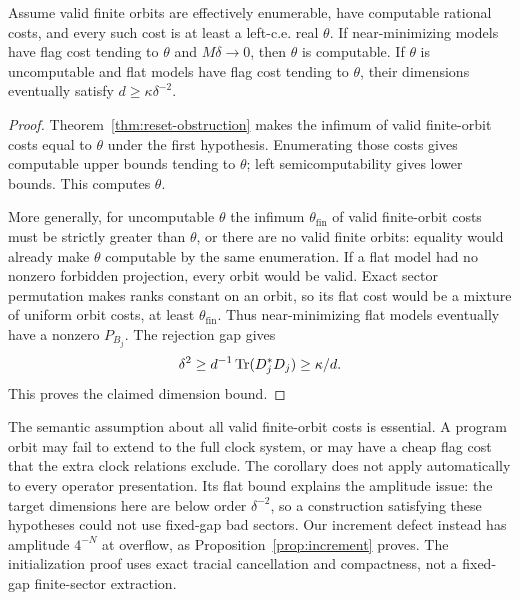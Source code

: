 \begin{corollary}\label{cor:reset-computability}
Assume valid finite orbits are effectively enumerable, have computable rational costs, and every such cost is at least a left-c.e. real $\theta$. If near-minimizing models have flag cost tending to $\theta$ and $M\delta\to0$, then $\theta$ is computable. If $\theta$ is uncomputable and flat models have flag cost tending to $\theta$, their dimensions eventually satisfy $d\ge\kappa\delta^{-2}$.
\end{corollary}
\begin{proof}
Theorem~\ref{thm:reset-obstruction} makes the infimum of valid finite-orbit costs equal to $\theta$ under the first hypothesis. Enumerating those costs gives computable upper bounds tending to $\theta$; left semicomputability gives lower bounds. This computes $\theta$.

More generally, for uncomputable $\theta$ the infimum $\theta_{\mathrm{fin}}$ of valid finite-orbit costs must be strictly greater than $\theta$, or there are no valid finite orbits: equality would already make $\theta$ computable by the same enumeration. If a flat model had no nonzero forbidden projection, every orbit would be valid. Exact sector permutation makes ranks constant on an orbit, so its flat cost would be a mixture of uniform orbit costs, at least $\theta_{\mathrm{fin}}$. Thus near-minimizing flat models eventually have a nonzero $P_{B_j}$. The rejection gap gives
\[
 \delta^2\ge d^{-1}\operatorname{Tr}(D_j^*D_j)\ge\kappa/d.
\]
This proves the claimed dimension bound.
\end{proof}

The semantic assumption about all valid finite-orbit costs is essential. A program orbit may fail to extend to the full clock system, or may have a cheap flag cost that the extra clock relations exclude. The corollary does not apply automatically to every operator presentation. Its flat bound explains the amplitude issue: the target dimensions here are below order $\delta^{-2}$, so a construction satisfying these hypotheses could not use fixed-gap bad sectors. Our increment defect instead has amplitude $4^{-N}$ at overflow, as Proposition~\ref{prop:increment} proves. The initialization proof uses exact tracial cancellation and compactness, not a fixed-gap finite-sector extraction.
